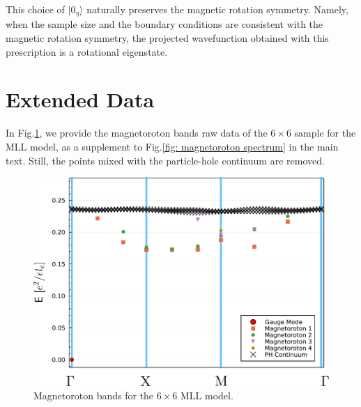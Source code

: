 \begin{subappendices}
    This choice of $|0_{\eta}\rangle$ naturally preserves the magnetic rotation symmetry. Namely, when the sample size and the boundary conditions are consistent with the magnetic rotation symmetry, the projected wavefunction obtained with this prescription is a rotational eigenstate.

    \section{Extended Data}\label{app:extended_data}
    In Fig.\ref{fig: supplemental tdhf bands}, we provide the magnetoroton bands raw data of the $6\times6$ sample for the MLL model, as a supplement to Fig.\ref{fig: magnetoroton spectrum} in the main text. Still, the points mixed with the particle-hole continuum are removed.
    \begin{figure}
        \centering
        \includegraphics[width=0.95\linewidth]{figures/FCI/supplemental_tdhf_bands.pdf}
        \caption{Magnetoroton bands for the $6\times6$ MLL model.}
        \label{fig: supplemental tdhf bands}
    \end{figure}

\end{subappendices}